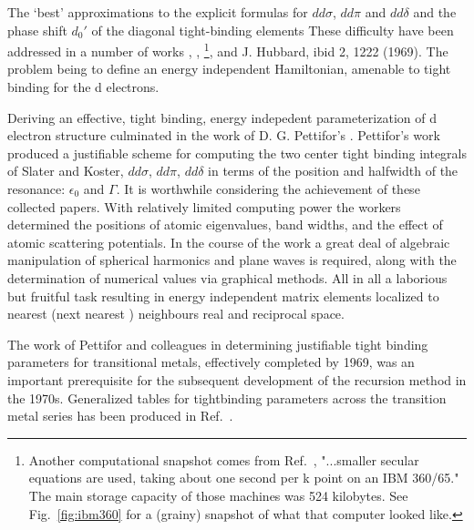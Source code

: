 The `best' approximations to the explicit formulas for $dd\sigma$, $dd\pi$ and $dd\delta$ and the phase
shift $d_{0}'$ of the diagonal tight-binding elements 
These difficulty have been addressed in a number of works 
\cite{hubbard67,mueller67}, \cite{hubbard68}, \cite{hubbard69} \footnote{Another computational
snapshot comes from Ref.~\cite{hubbard69}, "...smaller secular 
equations are used, taking about one second per k point on an IBM  360/65." The
main storage capacity of those machines was 524 kilobytes. See Fig.~\ref{fig:ibm360}
for a (grainy) snapshot of what that computer looked like.},
and J. Hubbard, ibid 2, 1222 (1969). The problem being to define an
energy independent Hamiltonian, amenable to tight binding for the d electrons.

Deriving an effective, tight binding, energy indepedent parameterization
of d electron structure  culminated in the work of D. G. Pettifor's \cite{pettifor69}. 
Pettifor's work produced a justifiable scheme for computing the two center tight binding integrals of Slater
and Koster, $dd\sigma$, $dd\pi$, $dd\delta$ in terms of the position and halfwidth of the resonance:
$\epsilon_0$ and $\Gamma$. It is worthwhile considering the achievement of these collected papers.
With relatively limited computing power the workers determined 
the positions of atomic eigenvalues, band widths, and the effect 
of atomic scattering potentials. In 
the course of the work a great deal of algebraic manipulation of spherical 
harmonics and plane waves is required, along with the determination
of numerical values via graphical methods. All in all a laborious but fruitful task resulting
in energy independent matrix elements localized to nearest (next nearest ) 
neighbours real and reciprocal space.

The work of Pettifor and colleagues in determining justifiable tight 
binding parameters for transitional metals, 
effectively completed by 1969, was an important prerequisite for the subsequent 
development of the recursion method in the 1970s. Generalized tables for tightbinding parameters 
across the transition metal series has been produced in Ref.~\cite{harrison80}.


